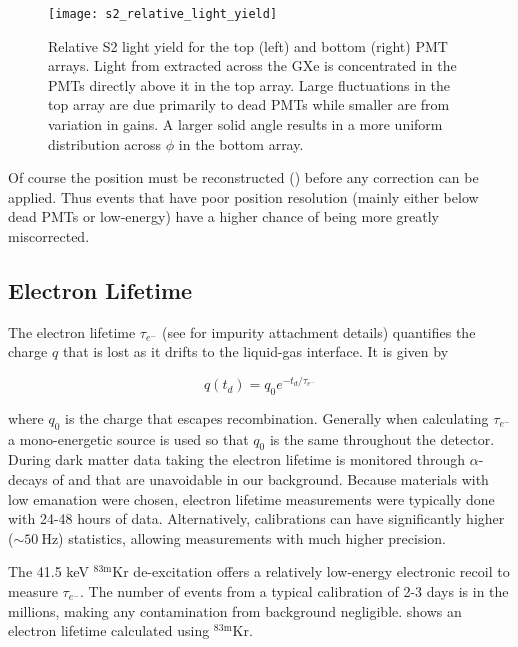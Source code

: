 \begin{figure}
\centering
\texttt{[image: s2\_relative\_light\_yield]}
\caption{Relative S2 light yield for the top (left) and bottom (right) PMT arrays.  Light from \electron extracted across the GXe is
concentrated in the PMTs directly above it in the top array.  Large fluctuations in the top array are due primarily to dead PMTs while
smaller are from variation in gains.  A larger solid angle results in a more uniform distribution across $\phi$ in the bottom array.}
\label{fig:calibrations_s2_maps}
\end{figure}

Of course the position must be reconstructed () before any correction can be
applied.  Thus events that have poor position resolution (mainly either below dead PMTs or low-energy) have a higher chance of being
more greatly miscorrected.



\subsection{Electron Lifetime}
\label{subsec:det_char_elifetime}
The electron lifetime $\tau_{e^-}$ (see  for impurity attachment details) quantifies the charge $q$
that is lost as it drifts to the liquid-gas interface.  It is given by

\begin{equation}
q(t_d) = q_0 e^{-t_d / \tau_{e^-}}
\label{eq:det_char_elifetime}
\end{equation}

\noindent where $q_0$ is the charge that escapes recombination.  Generally when calculating $\tau_{e^-}$ a mono-energetic source is used so
that $q_0$ is the same throughout the detector.  During dark matter data taking the electron lifetime is monitored through
$\alpha$-decays of  and  that are unavoidable in our background.  Because materials with low 
emanation were chosen, electron lifetime measurements were typically done with 24-48 hours of data.  Alternatively, calibrations can
have significantly higher (${\sim}50\ \mathrm{Hz}$) statistics, allowing measurements with much higher precision.

The 41.5 keV $\mathrm{^{83m}Kr}$ de-excitation offers a relatively low-energy electronic recoil to measure $\tau_{e^-}$.  The number of events
from a typical calibration of 2-3 days is in the millions, making any contamination from background
negligible.   shows an electron lifetime calculated using $\mathrm{^{83m}Kr}$.

